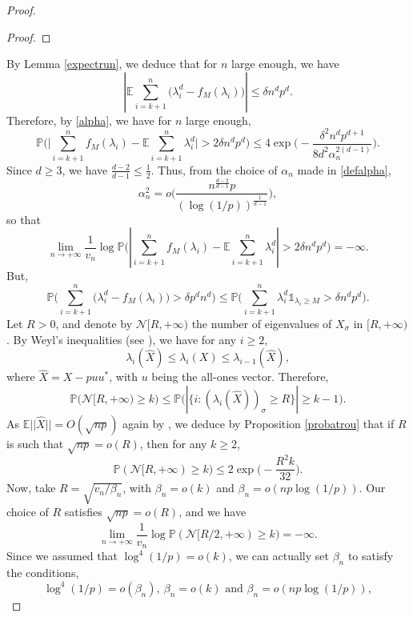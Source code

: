 \documentclass[aop,preprint]{imsart}
\newcommand\PP{\mathbb{P}}
\newcommand\EE{\mathbb{E}}
\newcommand\Car{\mathds{1}}
\numberwithin{equation}{section}
\theoremstyle{definition}
\theoremstyle{plain}
\theoremstyle{remark}
\begin{document}
\begin{proof}
\begin{proof}
\end{proof}
By Lemma \ref{expectrun}, we deduce that for $n$ large enough, we have
 $$ |\EE \sum_{i=k+1}^n\big( \lambda_i^d -  f_M(\lambda_i)\big)| \leq \delta n^dp^d.$$
Therefore, by \eqref{alpha}, we have for $n$ large enough,
$$  \PP\Big( \big|\sum_{i=k+1}^{n} f_M(\lambda_i)-\EE \sum_{i=k+1}^{n}  \lambda_i^d \big| >2\delta n^dp^d \Big) \leq 4\exp\Big( - \frac{\delta^2 n^{d}p^{d+1}}{ 8 d^2\alpha_n^{2(d-1)} }\Big).$$
Since $d\geq 3$, we have $\frac{d-2}{d-1} \leq \frac{1}{2}$. Thus, from the choice of $\alpha_n$ made in \eqref{defalpha},
$$ \alpha_n^2 = o\Big( \frac{n^{\frac{d-2}{d-1}} p}{(\log  (1/p))^{\frac{1}{d-1}}}\Big),$$ so that
\begin{equation} \label{expoequitrunER}\lim_{n\to +\infty} \frac{1}{v_n} \log \PP\Big( |\sum_{i=k+1}^{n} f_M(\lambda_i)- \EE \sum_{i=k+1}^n \lambda_i^d| >2\delta n^dp^d \Big)  = -\infty.\end{equation}
But, 
\begin{equation} \label{f} \PP \Big(  \sum_{i=k+1}^n \big(\lambda_i^d - f_M(\lambda_i)\big)>\delta p^d n^d \Big)\leq \PP\Big( \sum_{i=k+1}^n \lambda_i^d \Car_{\lambda_i\geq  M} >\delta n^dp^d\Big).\end{equation}
Let $R>0$, and denote by $\mathcal{N}[R,+\infty)$ the number of eigenvalues of $X_\sigma$ in $[R,+\infty)$. By Weyl's inequalities (see \cite[Theorem III.2.1]{Bhatia}), we have for any $i\geq 2$,
\begin{equation} \label{Weyl} \lambda_i(\hat X) \leq \lambda_i(X) \leq \lambda_{i-1}(\hat X),\end{equation}
where $\hat X = X -p u u^*$, with $u$ being the all-ones vector.
Therefore,
$$ \PP\big( \mathcal{N}[R,+\infty) \geq k \big) \leq \PP\big( |\{ i : (\lambda_i(\hat X))_\sigma \geq R \}| \geq k-1 \big).$$
As $\EE || \hat X|| =O( \sqrt{np})$ again by \cite[Example 4.10]{LHY}, we deduce by Proposition \ref{probatrou} that if $R$ is such that $\sqrt{np} = o(R)$, then for any $k\geq 2$, 
\begin{equation} \label{probtrouER} \PP( \mathcal{N}[R,+\infty) \geq k)\leq  2 \exp \Big( - \frac{R^2k}{32}\Big).\end{equation}
Now, take $R =  \sqrt{v_n/\beta_n}$, with $\beta_n =o( k)$ and $\beta_n = o(np \log(1/p))$.
Our choice of $R$ satisfies $\sqrt{np} = o(R)$, and we have
$$ \lim_{n\to +\infty} \frac{1}{v_n} \log \PP( \mathcal{N}[R/2,+\infty) \geq k)= - \infty.$$
Since we assumed that $\log^4(1/p) = o(k)$, we can actually set $\beta_n$ to satisfy the conditions,
\begin{equation} \label{defbetan} \log^4(1/p) = o(\beta_n), \ \beta_n =o(k) \text{ and } \beta_n = o(np \log(1/p)),\end{equation}

\end{proof}
\end{document}
